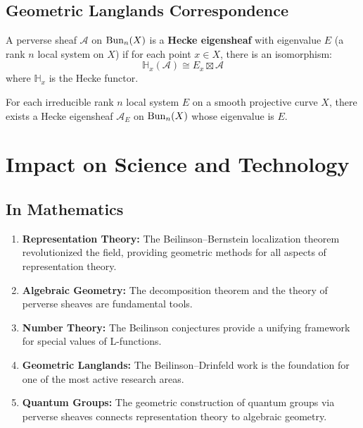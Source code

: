 \subsection{Geometric Langlands Correspondence}

\begin{definition}
A perverse sheaf $\mathcal{A}$ on $\operatorname{Bun}_n(X)$ is a \textbf{Hecke eigensheaf} with eigenvalue $E$ (a rank $n$ local system on $X$) if for each point $x \in X$, there is an isomorphism:
\[
\mathbb{H}_x(\mathcal{A}) \cong E_x \boxtimes \mathcal{A}
\]
where $\mathbb{H}_x$ is the Hecke functor.
\end{definition}

\begin{theorem}
For each irreducible rank $n$ local system $E$ on a smooth projective curve $X$, there exists a Hecke eigensheaf $\mathcal{A}_E$ on $\operatorname{Bun}_n(X)$ whose eigenvalue is $E$.
\end{theorem}

\section{Impact on Science and Technology}

\subsection{In Mathematics}

\begin{enumerate}
    \item \textbf{Representation Theory:} The Beilinson--Bernstein localization theorem revolutionized the field, providing geometric methods for all aspects of representation theory.
    \item \textbf{Algebraic Geometry:} The decomposition theorem and the theory of perverse sheaves are fundamental tools.
    \item \textbf{Number Theory:} The Beilinson conjectures provide a unifying framework for special values of L-functions.
    \item \textbf{Geometric Langlands:} The Beilinson--Drinfeld work is the foundation for one of the most active research areas.
    \item \textbf{Quantum Groups:} The geometric construction of quantum groups via perverse sheaves connects representation theory to algebraic geometry.
\end{enumerate}

